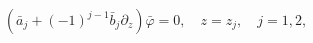 \begin{equation}
\left( \bar{a}_{j}+(-1)^{j-1}\bar{b}_{j}\partial _{z}\right) \bar{\varphi}%
=0,\quad z=z_{j},\quad j=1,2,  \label{bounconflat}
\end{equation}

